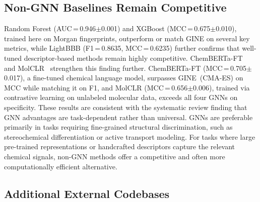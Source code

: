 \documentclass[conference]{IEEEtran}
\begin{document}
\subsection{Non-GNN Baselines Remain Competitive}

Random Forest (AUC\,=\,0.946$\pm$0.001) and XGBoost (MCC\,=\,0.675$\pm$0.010), trained
here on Morgan fingerprints, outperform or match GINE on several key
metrics, while LightBBB (F1\,=\,0.8635, MCC\,=\,0.6235) further
confirms that well-tuned descriptor-based methods remain highly
competitive. ChemBERTa-FT~\cite{Ahmad2022chemberta2} and
MolCLR~\cite{Wang2022molclr} strengthen this finding further.
ChemBERTa-FT (MCC\,=\,0.705$\pm$0.017), a fine-tuned chemical language model,
surpasses GINE~(CMA-ES) on MCC while matching it on F1, and MolCLR
(MCC\,=\,0.656$\pm$0.006), trained via contrastive learning on unlabeled
molecular data, exceeds all four GNNs on specificity. These results
are consistent with the systematic review finding that GNN advantages
are task-dependent rather than universal. GNNs are preferable primarily
in tasks requiring fine-grained structural discrimination, such as
stereochemical differentiation or active transport modeling. For tasks
where large pre-trained representations or handcrafted descriptors
capture the relevant chemical signals, non-GNN methods offer a
competitive and often more computationally efficient alternative.

\subsection{Additional External Codebases}
\end{document}
